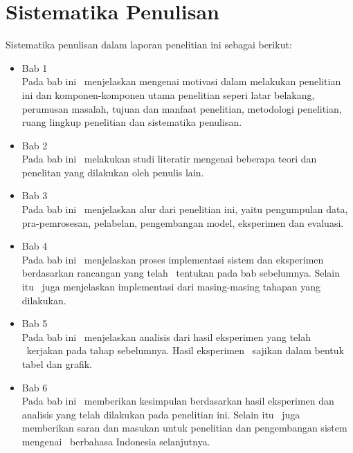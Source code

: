 \section{Sistematika Penulisan}
Sistematika penulisan dalam laporan penelitian ini sebagai berikut:
\begin{itemize}

	\item Bab 1 \babSatu \\
	Pada bab ini \saya~menjelaskan mengenai motivasi dalam melakukan penelitian ini dan komponen-komponen utama penelitian seperi latar belakang, perumusan masalah, tujuan dan manfaat penelitian, metodologi penelitian, ruang lingkup penelitian dan sistematika penulisan.
	
	\item Bab 2 \babDua \\
	Pada bab ini \saya~melakukan studi literatir mengenai beberapa teori dan penelitan yang dilakukan oleh penulis lain. 
		
	\item Bab 3 \babTiga \\
	Pada bab ini \saya~menjelaskan alur dari penelitian ini, yaitu pengumpulan data, pra-pemrosesan, pelabelan, pengembangan model, eksperimen dan evaluasi.
		
	\item Bab 4 \babEmpat \\
	Pada bab ini \saya~menjelaskan proses implementasi sistem dan eksperimen berdasarkan rancangan yang telah \penulis~tentukan pada bab sebelumnya. Selain itu \saya~juga menjelaskan implementasi dari masing-masing tahapan yang dilakukan.
		
	\item Bab 5 \babLima \\
	Pada bab ini \saya~menjelaskan analisis dari hasil eksperimen yang telah \saya~kerjakan pada tahap sebelumnya. Hasil eksperimen \saya~sajikan dalam bentuk tabel dan grafik.
	
	\item Bab 6 \babEnam \\
	Pada bab ini \saya~memberikan kesimpulan berdasarkan hasil eksperimen dan analisis yang telah dilakukan pada penelitian ini. Selain itu \saya~juga memberikan saran dan masukan untuk penelitian dan pengembangan sistem mengenai \mer~berbahasa Indonesia selanjutnya.
	
\end{itemize}